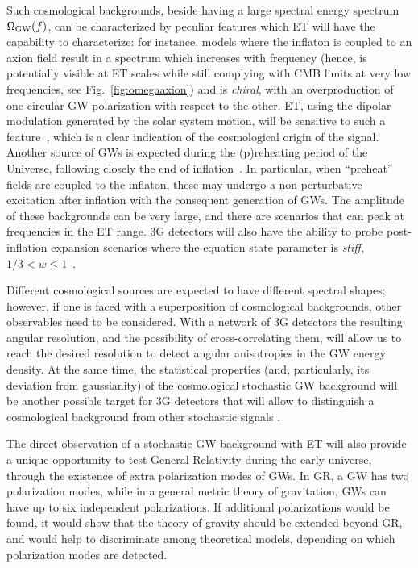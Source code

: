 Such cosmological backgrounds, beside having a large spectral energy spectrum $\Omega_{\rm GW}(f)$, can be characterized by peculiar features which ET will have the capability to characterize: for instance, models where the inflaton is coupled to an axion field 
result in a spectrum which increases with frequency (hence, is potentially visible at ET scales while still complying with CMB limits at very low frequencies, see 
Fig.~\ref{fig:omegaaxion}) and is {\it chiral}, with an overproduction of one circular GW polarization with respect to  the other.  ET,  using the dipolar modulation generated by the solar system motion, will be sensitive to such a feature~\cite{Domcke:2019zls}, which is a clear indication of the cosmological origin of the signal.  
Another source of GWs is expected during the (p)reheating period of the Universe, following closely the end of
inflation~\cite{Kofman:1994rk,Kofman:1997yn,Greene:1998nh,Greene:2000ew}. In particular, when ``preheat'' fields are coupled to the inflaton, these may undergo
a non-perturbative excitation after inflation with the consequent generation of GWs. The amplitude of these backgrounds
can be very large, and there are scenarios that can peak at frequencies in the ET range. 3G detectors will also have  the ability to probe post-inflation expansion scenarios where the equation state parameter is {\it stiff},  $1/3 < w\leq 1$~\cite{Figueroa:2019paj}. 
	
Different cosmological sources are expected to have different spectral shapes; however, if one is faced with a superposition of cosmological backgrounds, other observables need to be considered. With a network of 3G detectors the resulting angular resolution, and the possibility of cross-correlating them, will allow us to reach the desired resolution to detect angular anisotropies in the GW energy density. At the same time, the statistical properties (and, particularly, its deviation from gaussianity) of the cosmological stochastic GW background will be another possible target for 3G detectors that will allow to distinguish a cosmological background from other stochastic signals \cite{Bartolo:2019oiq}.

The direct observation of a stochastic GW background with ET will also provide a unique opportunity to test General Relativity during the early universe, through the existence of extra polarization modes of GWs. In GR, a GW has two polarization modes, while in a general metric theory of gravitation,  GWs can have  up to  six independent polarizations. If additional polarizations would be found, it would show that the theory of gravity should be extended beyond GR, and would help to discriminate among theoretical models, depending on which polarization modes are detected.




